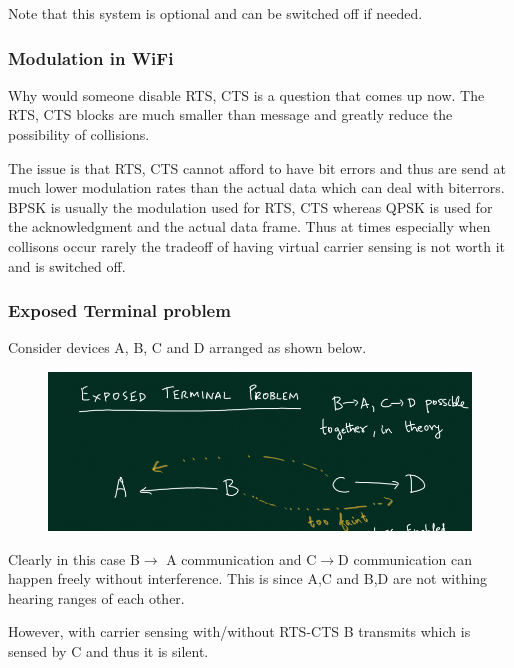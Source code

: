 \documentclass[12pt]{article}
\newcommand{\tbox}[1]{\noindent\fbox{\parbox{\textwidth}{#1}}}
\begin{document}
Note that this system is optional and can be switched off if needed. 



\noindent\tbox{
    \begin{center}
    \textbf{\Huge Lecture 17}
    \end{center}
}


\subsubsection{Modulation in WiFi}
Why would someone disable RTS, CTS is a question that comes up now. The RTS, CTS 
blocks are much smaller than message and greatly reduce the possibility of collisions. 

The issue is that RTS, CTS cannot afford to have bit errors and thus are send at much lower 
modulation rates than the actual data which can deal with biterrors. BPSK is usually 
the modulation used for RTS, CTS whereas QPSK is used for the acknowledgment and the actual data frame. 
Thus at times especially when collisons occur rarely the tradeoff of having virtual carrier sensing is not 
worth it and is switched off. 


\subsubsection{Exposed Terminal problem}

Consider devices A, B, C and D arranged as shown below. 

\begin{figure}[H]
    \includegraphics{Diagrams/Exposed_terminal.png}
\end{figure}

Clearly in this case B\(\rightarrow\) A communication and C\( \rightarrow\)D communication can happen
freely without interference. This is since A,C and B,D are not withing hearing ranges of each other. 

However, with carrier sensing with/without RTS-CTS B transmits which is sensed by C and thus it is silent. 
\end{document}
